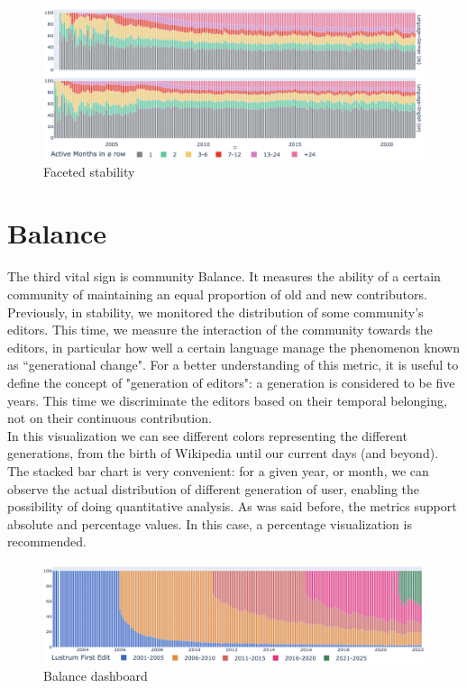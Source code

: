 \begin{figure}[!h]
    \centering
    \includegraphics[width=470px]{img/multiple_stability.png}
    \caption{Faceted stability}
    \label{fig:multiple_stability}
\end{figure}

\section{Balance}
\label{sec:balance}

The third vital sign is community Balance. It measures the ability of a certain community of maintaining an equal proportion of old and new contributors. Previously, in stability, we monitored the distribution of some community's editors. This time, we measure the interaction of the community towards the editors, in particular how well a certain language manage the phenomenon known as ``generational change". For a better understanding of this metric, it is useful to define the concept of "generation of editors": a generation is considered to be five years. This time we discriminate the editors based on their temporal belonging, not on their continuous contribution.\\
In this visualization we can see different colors representing the different generations, from the birth of Wikipedia until our current days (and beyond).
The stacked bar chart is very convenient: for a given year, or month, we can observe the actual distribution of different generation of user, enabling the possibility of doing quantitative analysis. As was said before, the metrics support absolute and percentage values. In this case, a percentage visualization is recommended.

\begin{figure}[h]
    \centering
    \includegraphics[width=470px]{img/balance.png}
    \caption{Balance dashboard}
    \label{fig:balance}
\end{figure}

